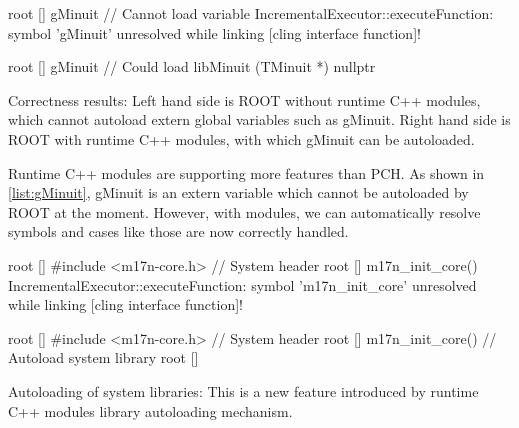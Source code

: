 \documentclass{webofc}
\begin{document}
\begin{listing}[h]
    \noindent
    \begin{minipage}[h]{.48\textwidth}
    \begin{cppcode*}{}
    root [] gMinuit // Cannot load variable
    IncrementalExecutor::executeFunction:
    symbol 'gMinuit' unresolved while
    linking [cling interface function]!
    \end{cppcode*}
    \end{minipage}\hfill
    \begin{minipage}[h]{.48\textwidth}
    \begin{cppcode*}{}
    root [] gMinuit // Could load libMinuit
    (TMinuit *) nullptr
    \end{cppcode*}
    \end{minipage}
    \caption{Correctness results: Left hand side is ROOT without runtime C++ modules, which cannot autoload extern global variables such as gMinuit. Right hand side is ROOT with runtime C++ modules, with which gMinuit can be autoloaded.}
    \label{list:gMinuit}
\end{listing}

Runtime C++ modules are supporting more features than PCH. As shown in \ref{list:gMinuit}, gMinuit is an extern variable which cannot be autoloaded by ROOT at the moment. However, with modules, we can automatically resolve symbols and cases like those are now correctly handled.

\begin{listing}[h]
    \noindent
    \begin{minipage}[h]{.48\textwidth}
    \begin{cppcode*}{}
    root [] #include <m17n-core.h> // System header
    root [] m17n_init_core()
    IncrementalExecutor::executeFunction:
    symbol 'm17n_init_core' unresolved while
    linking [cling interface function]!
    \end{cppcode*}
    \end{minipage}\hfill
    \begin{minipage}[h]{.48\textwidth}
    \begin{cppcode*}{}
    root [] #include <m17n-core.h> // System header
    root [] m17n_init_core() // Autoload system library
    root []
    \end{cppcode*}
    \end{minipage}
    \caption{Autoloading of system libraries: This is a new feature introduced by runtime C++ modules library autoloading mechanism.}
    \label{list:gMinuit}
\end{listing}
\end{document}
